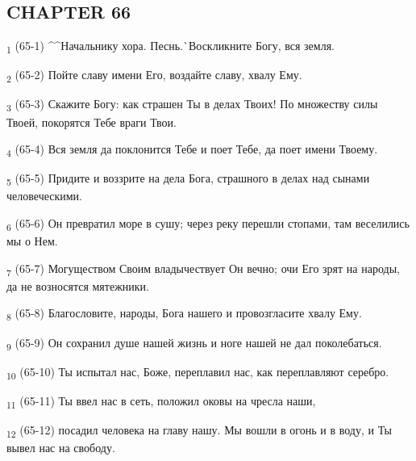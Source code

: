 \subsection{CHAPTER 66}
\begin{tcolorbox}
\textsubscript{1} (65-1) ^^Начальнику хора. Песнь.^^ Воскликните Богу, вся земля.
\end{tcolorbox}
\begin{tcolorbox}
\textsubscript{2} (65-2) Пойте славу имени Его, воздайте славу, хвалу Ему.
\end{tcolorbox}
\begin{tcolorbox}
\textsubscript{3} (65-3) Скажите Богу: как страшен Ты в делах Твоих! По множеству силы Твоей, покорятся Тебе враги Твои.
\end{tcolorbox}
\begin{tcolorbox}
\textsubscript{4} (65-4) Вся земля да поклонится Тебе и поет Тебе, да поет имени Твоему.
\end{tcolorbox}
\begin{tcolorbox}
\textsubscript{5} (65-5) Придите и воззрите на дела Бога, страшного в делах над сынами человеческими.
\end{tcolorbox}
\begin{tcolorbox}
\textsubscript{6} (65-6) Он превратил море в сушу; через реку перешли стопами, там веселились мы о Нем.
\end{tcolorbox}
\begin{tcolorbox}
\textsubscript{7} (65-7) Могуществом Своим владычествует Он вечно; очи Его зрят на народы, да не возносятся мятежники.
\end{tcolorbox}
\begin{tcolorbox}
\textsubscript{8} (65-8) Благословите, народы, Бога нашего и провозгласите хвалу Ему.
\end{tcolorbox}
\begin{tcolorbox}
\textsubscript{9} (65-9) Он сохранил душе нашей жизнь и ноге нашей не дал поколебаться.
\end{tcolorbox}
\begin{tcolorbox}
\textsubscript{10} (65-10) Ты испытал нас, Боже, переплавил нас, как переплавляют серебро.
\end{tcolorbox}
\begin{tcolorbox}
\textsubscript{11} (65-11) Ты ввел нас в сеть, положил оковы на чресла наши,
\end{tcolorbox}
\begin{tcolorbox}
\textsubscript{12} (65-12) посадил человека на главу нашу. Мы вошли в огонь и в воду, и Ты вывел нас на свободу.
\end{tcolorbox}
